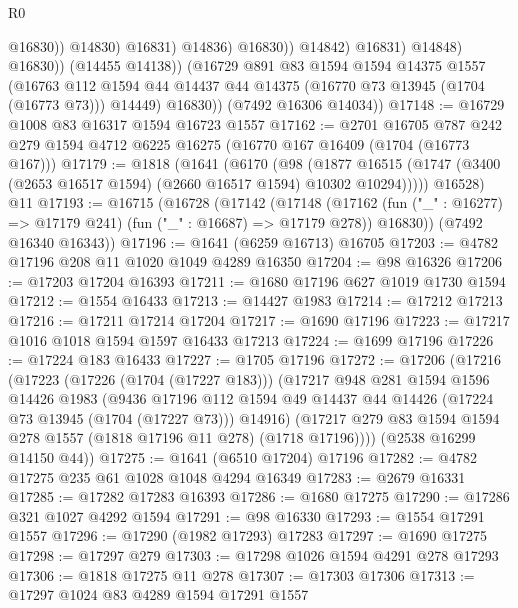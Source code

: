 \begin{lexlean}{R0}
\begin{coremodule}
                                  @16830))
                              @14830)
                            @16831)
                          @14836)
                        @16830))
                    @14842)
                  @16831)
                @14848)
              @16830))
          (@14455 @14138))
        (@16729
          @891
          @83
          @1594
          @1594
          @14375
          @1557
          (@16763 @112 @1594 @44 @14437 @44 @14375 (@16770 @73 @13945 (@1704 (@16773 @73))) @14449)
          @16830))
      (@7492 @16306 @14034))
@17148 := @16729 @1008 @83 @16317 @1594 @16723 @1557
@17162 := @2701
    @16705
    @787
    @242
    @279
    @1594
    @4712
    @6225
    @16275
    (@16770 @167 @16409 (@1704 (@16773 @167)))
@17179 := @1818
    (@1641
      (@6170
        (@98
          (@1877 @16515 (@1747 (@3400 (@2653 @16517 @1594) (@2660 @16517 @1594) @10302 @10294)))))
      @16528)
    @11
@17193 := @16715
    (@16728
      (@17142
        (@17148
          (@17162 (fun ("_" : @16277) => @17179 @241) (fun ("_" : @16687) => @17179 @278))
          @16830))
      (@7492 @16340 @16343))
@17196 := @1641 (@6259 @16713) @16705
@17203 := @4782 @17196 @208 @11 @1020 @1049 @4289 @16350
@17204 := @98 @16326
@17206 := @17203 @17204 @16393
@17211 := @1680 @17196 @627 @1019 @1730 @1594
@17212 := @1554 @16433
@17213 := @14427 @1983
@17214 := @17212 @17213
@17216 := @17211 @17214 @17204
@17217 := @1690 @17196
@17223 := @17217 @1016 @1018 @1594 @1597 @16433 @17213
@17224 := @1699 @17196
@17226 := @17224 @183 @16433
@17227 := @1705 @17196
@17272 := @17206
    (@17216
      (@17223
        (@17226 (@1704 (@17227 @183)))
        (@17217
          @948
          @281
          @1594
          @1596
          @14426
          @1983
          (@9436
            @17196
            @112
            @1594
            @49
            @14437
            @44
            @14426
            (@17224 @73 @13945 (@1704 (@17227 @73)))
            @14916)
          (@17217 @279 @83 @1594 @1594 @278 @1557 (@1818 @17196 @11 @278) (@1718 @17196))))
      (@2538 @16299 @14150 @44))
@17275 := @1641 (@6510 @17204) @17196
@17282 := @4782 @17275 @235 @61 @1028 @1048 @4294 @16349
@17283 := @2679 @16331
@17285 := @17282 @17283 @16393
@17286 := @1680 @17275
@17290 := @17286 @321 @1027 @4292 @1594
@17291 := @98 @16330
@17293 := @1554 @17291 @1557
@17296 := @17290 (@1982 @17293) @17283
@17297 := @1690 @17275
@17298 := @17297 @279
@17303 := @17298 @1026 @1594 @4291 @278 @17293
@17306 := @1818 @17275 @11 @278
@17307 := @17303 @17306
@17313 := @17297 @1024 @83 @4289 @1594 @17291 @1557

\end{coremodule}
\end{lexlean}
